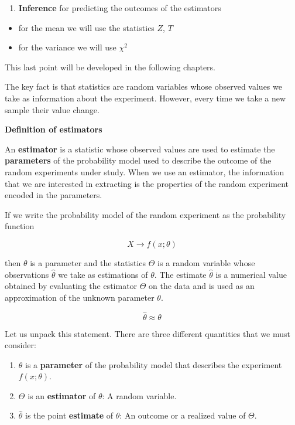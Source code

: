 \documentclass[
]{book}
\providecommand{\tightlist}{%
  \setlength{\itemsep}{0pt}\setlength{\parskip}{0pt}}
\begin{document}
\begin{enumerate}
\def\labelenumi{\arabic{enumi}.}
\setcounter{enumi}{2}
\tightlist
\item
  \textbf{Inference} for predicting the outcomes of the estimators
\end{enumerate}

\begin{itemize}
\tightlist
\item
  for the mean we will use the statistics \(Z\), \(T\)
\item
  for the variance we will use \(\chi^2\)
\end{itemize}

This last point will be developed in the following chapters.

The key fact is that statistics are random variables whose observed values we take as information about the experiment. However, every time we take a new sample their value change.

\textbf{Definition of estimators}

An \textbf{estimator} is a statistic whose observed values are used to estimate the \textbf{parameters} of the probability model used to describe the outcome of the random experiments under study. When we use an estimator, the information that we are interested in extracting is the properties of the random experiment encoded in the parameters.

If we write the probability model of the random experiment as the probability function

\[X \rightarrow f(x; \theta)\]

then \(\theta\) is a parameter and the statistics \(\Theta\) is a random variable whose observations \(\hat{\theta}\) we take as estimations of \(\theta\). The estimate \(\hat{\theta}\) is a numerical value obtained by evaluating the estimator \(\Theta\) on the data and is used as an approximation of the unknown parameter \(\theta\).

\[\hat{\theta} \approx \theta\]

Let us unpack this statement. There are three different quantities that we must consider:

\begin{enumerate}
\def\labelenumi{\arabic{enumi}.}
\tightlist
\item
  \(\theta\) is a \textbf{parameter} of the probability model that describes the experiment \(f(x; \theta)\).
\item
  \(\Theta\) is an \textbf{estimator} of \(\theta\): A random variable.
\item
  \(\hat{\theta}\) is the point \textbf{estimate} of \(\theta\): An outcome or a realized value of \(\Theta\).
\end{enumerate}
\end{document}
